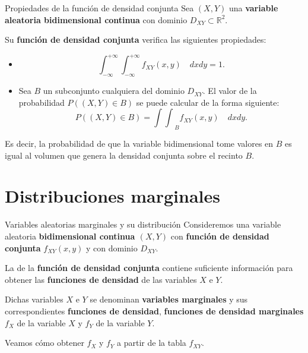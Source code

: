 \documentclass[
  ignorenonframetext,
]{beamer}
\begin{document}
\begin{frame}{Propiedades de la función de densidad conjunta}
\protect\hypertarget{propiedades-de-la-funciuxf3n-de-densidad-conjunta}{}
Sea \((X,Y)\) una \textbf{variable aleatoria bidimensional continua} con
dominio \(D_{XY}\subset \mathbb{R}^2\).

Su \textbf{función de densidad conjunta} verifica las siguientes
propiedades:

\begin{itemize}
\item
  \[\int_{-\infty}^{+\infty}\int_{-\infty}^{+\infty} f_{XY}(x,y)\quad  dx dy=1.\]
\item
  Sea \(B\) un subconjunto cualquiera del dominio \(D_{XY}\). El valor
  de la probabilidad \(P((X,Y)\in B)\) se puede calcular de la forma
  siguiente: \[
  P((X,Y)\in B) ={\int\int}_B f_{XY}(x,y)\quad  dx dy.
  \]
\end{itemize}

Es decir, la probabilidad de que la variable bidimensional tome valores
en \(B\) es igual al volumen que genera la densidad conjunta sobre el
recinto \(B\).
\end{frame}

\hypertarget{distribuciones-marginales}{%
\section{Distribuciones marginales}\label{distribuciones-marginales}}

\begin{frame}{Variables aleatorias marginales y su distribución}
\protect\hypertarget{variables-aleatorias-marginales-y-su-distribuciuxf3n}{}
Consideremos una variable aleatoria \textbf{bidimensional continua
\((X,Y)\)} con \textbf{función de densidad conjunta} \(f_{XY}(x,y)\) y
con dominio \(D_{XY}\).

La de la \textbf{función de densidad conjunta} contiene suficiente
información para obtener las \textbf{funciones de densidad} de las
variables \(X\) e \(Y\).

Dichas variables \(X\) e \(Y\) se denominan \textbf{variables
marginales} y sus correspondientes \textbf{funciones de densidad},
\textbf{funciones de densidad marginales} \(f_X\) de la variable \(X\) y
\(f_Y\) de la variable \(Y\).

Veamos cómo obtener \(f_X\) y \(f_Y\) a partir de la tabla \(f_{XY}\).
\end{frame}
\end{document}
